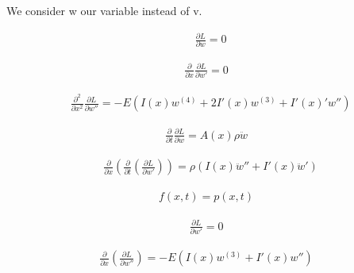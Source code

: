 We consider w our variable instead of v.

\begin{equation}
    \begin{split}
        &\frac{\partial L}{\partial w} = 0
    \end{split}
\end{equation}

\begin{equation}
    \begin{split}
        \frac{\partial}{\partial x}\frac{\partial L}{\partial w'} = 0 
    \end{split}
\end{equation}

\begin{equation}
    \begin{split}
        &\frac{\partial^2}{\partial x^2}\frac{\partial L}{\partial w''} = -E\left(I(x)w^{(4)}+2I'(x)w^{(3)}+I'(x)'w''\right)
    \end{split}
\end{equation}

\begin{equation}
    \begin{split}
        \frac{\partial}{\partial t}\frac{\partial L}{\partial \dot w} = A(x)\rho \ddot w
    \end{split}
\end{equation}

\begin{equation}
    \begin{split}
        &\frac{\partial}{\partial x}\left(\frac{\partial}{\partial t}\left(\frac{\partial L}{\partial \dot w'}\right)\right) = \rho \left(I(x)\ddot w''+I'(x)\ddot w'\right)
    \end{split}
\end{equation}

\begin{equation}
    \begin{split}
        f(x,t) = p(x,t)
    \end{split}
\end{equation}

\begin{equation}
    \begin{split}
        \frac{\partial L }{\partial w'}= 0
    \end{split}
\end{equation}

\begin{equation}
    \begin{split}
        \frac{\partial}{\partial x}(\frac{\partial L}{\partial  w''}) = -E\left(I(x)w^{(3)}+I'(x)w''\right)
    \end{split}
\end{equation}

